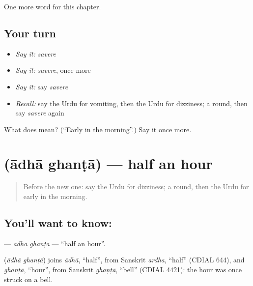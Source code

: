 \begin{grammarlens}[title={What you've built}]
One more word for this chapter.
\end{grammarlens}

\subsection*{Your turn}
\begin{itemize}
\raggedright
  \item \emph{Say it:} \emph{savere}
  \item \emph{Say it:} \emph{savere}, once more
  \item \emph{Say it:} say \emph{savere}
  \item \emph{Recall:} say the Urdu for vomiting, then the Urdu for dizziness; a round, then say \emph{savere} again
\end{itemize}

\begin{tcolorbox}[breakable,colback=teal!4,colframe=teal!35!black,title={Before you move on}]
What does  mean? (\textquotedblleft{}Early in the morning\textquotedblright{}.) Say it once more.
\end{tcolorbox}
\section[\texorpdfstring{\ur{آدھا} \ur{گھنٹہ} (ādhā ghanṭā)}{آدھا گھنٹہ (ādhā ghanṭā)}]{  (ādhā ghanṭā) — half an hour}

\label{lesson:UR-C155-adha-ghanta}



\begin{quote}
Before the new one: say the Urdu for dizziness; a round, then the Urdu for early in the morning.
\end{quote}

\subsection*{You'll want to know:  }
\textbf{ } — \emph{ādhā ghanṭā} — \textquotedblleft{}half an hour\textquotedblright{}.

\begin{cousinweb}
\textbf{ } (\emph{ādhā ghanṭā}) joins \emph{ādhā}, \textquotedblleft{}half\textquotedblright{}, from Sanskrit \emph{ardha}, \textquotedblleft{}half\textquotedblright{} (CDIAL 644), and \emph{ghanṭā}, \textquotedblleft{}hour\textquotedblright{}, from Sanskrit \emph{ghaṇṭā}, \textquotedblleft{}bell\textquotedblright{} (CDIAL 4421): the hour was once struck on a bell.
\end{cousinweb}

